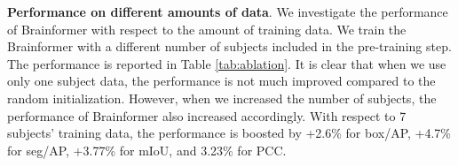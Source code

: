 \noindent
\textbf{Performance on different amounts of data}.
\label{sec:abl_amount_data}
We investigate the performance of Brainformer with respect to the amount of training data.
We train the Brainformer with a different number of subjects included in the pre-training step. The performance is reported in Table \ref{tab:ablation}. It is clear that when we use only one subject data, the performance is not much improved compared to the random initialization. However, when we increased the number of subjects, the performance of Brainformer also increased accordingly. With respect to 7 subjects' training data, the performance is boosted by +2.6\% for box/AP, +4.7\% for seg/AP, +3.77\% for mIoU, and 3.23\% for PCC.
\begin{table}[!b]
\small
\centering
\addtolength{\tabcolsep}{-2.5pt}
\vspace{-5mm}
\caption{Performance of Brainformer on various settings.}
\label{tab:ablation}
\vspace{-3mm}
\end{table}

